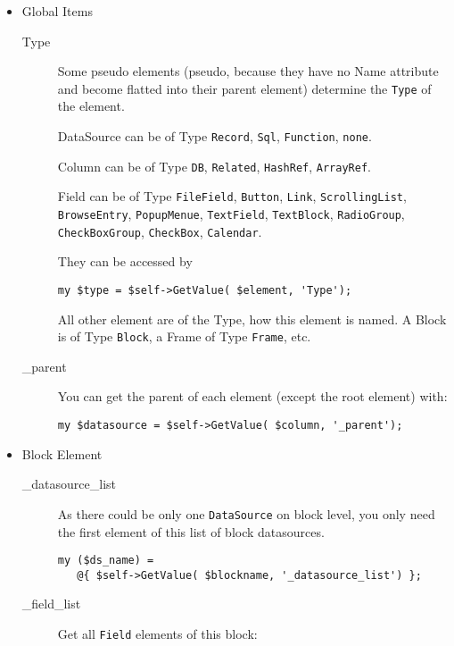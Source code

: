 \documentclass[a4paper,11pt]{scrartcl}
\begin{document}
\begin{itemize}
   \item Global Items
      \begin{description}
         \item[Type] Some pseudo elements (pseudo, because they have no Name
            attribute and become flatted into their parent element)
            determine the \verb+Type+ of the element.
            
            DataSource can be of Type \verb+Record+, \verb+Sql+,
            \verb+Function+, \verb+none+.

            Column can be of Type \verb+DB+, \verb+Related+,
            \verb+HashRef+, \verb+ArrayRef+.
            
            Field can be of Type \verb+FileField+, \verb+Button+,
            \verb+Link+, \verb+ScrollingList+, \verb+BrowseEntry+,
            \verb+PopupMenue+, \verb+TextField+, \verb+TextBlock+,
            \verb+RadioGroup+, \verb+CheckBoxGroup+, \verb+CheckBox+,
            \verb+Calendar+.

            They can be accessed by

            \verb+my $type = $self->GetValue( $element, 'Type');+

            All other element are of the Type, how this element is named.
            A Block is of Type \verb+Block+, a Frame of
            Type \verb+Frame+, etc.
         \item[\_parent]
            You can get the parent of each element (except the root
            element) with:

            \verb+my $datasource = $self->GetValue( $column, '_parent');+

      \end{description}

   \item Block Element
      \begin{description}
         \item[\_datasource\_list]
            As there could be only one \verb+DataSource+ on block level,
            you only need the first element of this list of block datasources.

            \verb+my ($ds_name) =+ \\
            \verb+   @{ $self->GetValue( $blockname, '_datasource_list') };+

         \item[\_field\_list]
            Get all \verb+Field+ elements of this block:


\end{description}
\end{itemize}
\end{document}

